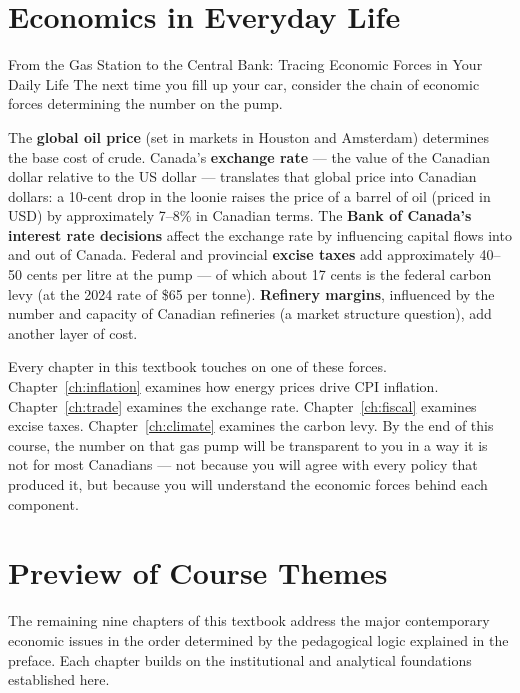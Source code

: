 \section{Economics in Everyday Life}

\begin{everydaylife}{From the Gas Station to the Central Bank: Tracing Economic Forces in Your Daily Life}
The next time you fill up your car, consider the chain of economic
forces determining the number on the pump.

The \textbf{global oil price} (set in markets in Houston and Amsterdam)
determines the base cost of crude. Canada's \textbf{exchange rate} ---
the value of the Canadian dollar relative to the US dollar --- translates
that global price into Canadian dollars: a 10-cent drop in the loonie
raises the price of a barrel of oil (priced in USD) by approximately
7--8\% in Canadian terms. The \textbf{Bank of Canada's interest rate
decisions} affect the exchange rate by influencing capital flows into and
out of Canada. Federal and provincial \textbf{excise taxes} add
approximately 40--50 cents per litre at the pump --- of which about
17 cents is the federal carbon levy (at the 2024 rate of \$65 per tonne).
\textbf{Refinery margins}, influenced by the number and capacity of
Canadian refineries (a market structure question), add another layer of cost.

Every chapter in this textbook touches on one of these forces. Chapter~\ref{ch:inflation}
examines how energy prices drive CPI inflation. Chapter~\ref{ch:trade}
examines the exchange rate. Chapter~\ref{ch:fiscal} examines excise taxes.
Chapter~\ref{ch:climate} examines the carbon levy. By the end of this course,
the number on that gas pump will be transparent to you in a way it is not
for most Canadians --- not because you will agree with every policy that
produced it, but because you will understand the economic forces behind each
component.
\end{everydaylife}

\section{Preview of Course Themes}
\label{sec:course_preview}

The remaining nine chapters of this textbook address the major contemporary
economic issues in the order determined by the pedagogical logic explained
in the preface. Each chapter builds on the institutional and analytical
foundations established here.

